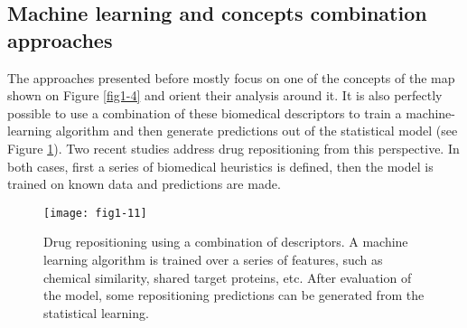 \subsection{Machine learning and concepts combination approaches}

The approaches presented before mostly focus on one of the concepts of the map shown on Figure \ref{fig1-4} and orient their analysis around it. It is also perfectly possible to use a combination of these biomedical descriptors to train a machine-learning algorithm and then generate predictions out of the statistical model (see Figure \ref{fig1-11}). Two recent studies address drug repositioning from this perspective. In both cases, first a series of biomedical heuristics is defined, then the model is trained on known data and predictions are made.

\begin{figure}[ht]
    \centering
    \texttt{[image: fig1-11]}
    \caption{Drug repositioning using a combination of descriptors. A machine learning algorithm is trained over a series of features, such as chemical similarity, shared target proteins, etc. After evaluation of the model, some repositioning predictions can be generated from the statistical learning.}
    \label{fig1-11}
\end{figure}

